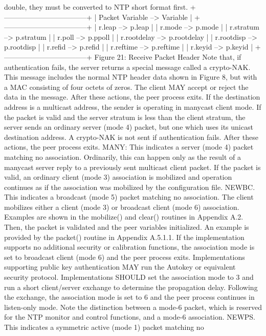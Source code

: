  double, they must be converted to NTP short format first.
 +-----------------------------------+
 | Packet Variable --> Variable |
 +-----------------------------------+
 | r.leap --> p.leap |
 | r.mode --> p.mode |
 | r.stratum --> p.stratum |
 | r.poll --> p.ppoll |
 | r.rootdelay --> p.rootdelay |
 | r.rootdisp --> p.rootdisp |
 | r.refid --> p.refid |
 | r.reftime --> p.reftime |
 | r.keyid --> p.keyid |
 +-----------------------------------+
 Figure 21: Receive Packet Header
 Note that, if authentication fails, the server returns a special
 message called a crypto-NAK. This message includes the normal NTP
 header data shown in Figure 8, but with a MAC consisting of four
 octets of zeros. The client MAY accept or reject the data in the
 message. After these actions, the peer process exits.
 If the destination address is a multicast address, the sender is
 operating in manycast client mode. If the packet is valid and the
 server stratum is less than the client stratum, the server sends an
 ordinary server (mode 4) packet, but one which uses its unicast
 destination address. A crypto-NAK is not sent if authentication
 fails. After these actions, the peer process exits.
 MANY: This indicates a server (mode 4) packet matching no
 association. Ordinarily, this can happen only as the result of a
 manycast server reply to a previously sent multicast client packet.
If the packet is valid, an ordinary client (mode 3) association is
 mobilized and operation continues as if the association was mobilized
 by the configuration file.
 NEWBC. This indicates a broadcast (mode 5) packet matching no
 association. The client mobilizes either a client (mode 3) or
 broadcast client (mode 6) association. Examples are shown in the
 mobilize() and clear() routines in Appendix A.2. Then, the packet is
 validated and the peer variables initialized. An example is provided
 by the packet() routine in Appendix A.5.1.1.
 If the implementation supports no additional security or calibration
 functions, the association mode is set to broadcast client (mode 6)
 and the peer process exits. Implementations supporting public key
 authentication MAY run the Autokey or equivalent security protocol.
 Implementations SHOULD set the association mode to 3 and run a short
 client/server exchange to determine the propagation delay. Following
 the exchange, the association mode is set to 6 and the peer process
 continues in listen-only mode. Note the distinction between a mode-6
 packet, which is reserved for the NTP monitor and control functions,
 and a mode-6 association.
 NEWPS. This indicates a symmetric active (mode 1) packet matching no
